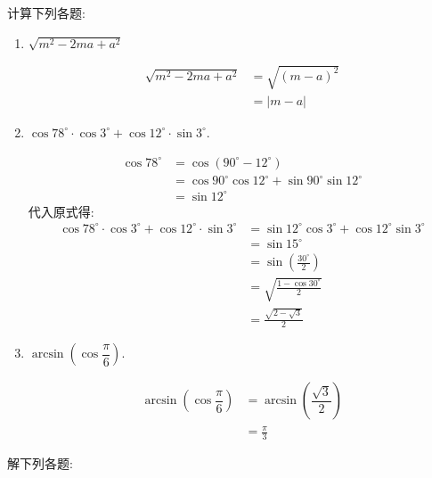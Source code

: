 \begin{questions}
\begin{enumerate}[label=(\arabic*)]
	\end{enumerate}

	\question 计算下列各题:
	\begin{enumerate}[label=(\arabic*)]
		\item $\sqrt{m^2 - 2ma + a^2} $
		      \begin{solution}
			      \begin{align*}
				      \sqrt{m^2 - 2ma + a^2} & = \sqrt{(m-a)^2} \\
				                             & = |m-a|
			      \end{align*}
		      \end{solution}
		\item $\cos78^\circ\cdot\cos3^\circ + \cos12^\circ\cdot\sin3^\circ$.
		      \begin{solution}
			      \begin{align*}
				      \cos78^\circ & = \cos(90^\circ - 12^\circ)                           \\
				                   & = \cos90^\circ\cos12^\circ + \sin90^\circ\sin12^\circ \\
				                   & = \sin12^\circ
			      \end{align*}
			      代入原式得:
			      \begin{align*}
				      \cos78^\circ\cdot\cos3^\circ + \cos12^\circ\cdot\sin3^\circ
				       & = \sin12^\circ\cos3^\circ + \cos12^\circ\sin3^\circ \\
				       & = \sin15^\circ                                      \\
				       & = \sin\left(\frac{30^\circ}{2}\right)               \\
				       & = \sqrt{\frac{1-\cos30^\circ}{2}}                   \\
				       & = \frac{\sqrt{2-\sqrt{3}}}{2}
			      \end{align*}
		      \end{solution}
		\item $\arcsin\left(\cos\dfrac\pi6\right)$.
		      \begin{solution}
			      \begin{align*}
				      \arcsin\left(\cos\dfrac\pi6\right) & = \arcsin(\dfrac{\sqrt{3}}2) \\
				                                         & = \frac{\pi}{3}
			      \end{align*}
		      \end{solution}
	\end{enumerate}
	\question 解下列各题:

\end{questions}
